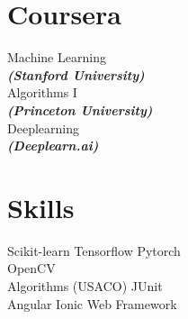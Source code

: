 \documentclass[]{deedy-resume-openfont}
\begin{document}
\begin{minipage}[t]{0.33\textwidth}
\section{Coursera}
Machine Learning \\
{\footnotesize \textit{\textbf{(Stanford University)}}} \\

\vspace{2mm}
Algorithms I \\
{\footnotesize \textit{\textbf{(Princeton University)}}} \\

\vspace{2mm}
Deeplearning \\
{\footnotesize \textit{\textbf{(Deeplearn.ai)}}} \\
\sectionsep


\section{Skills}

\textbullet{} Scikit-learn \textbullet{} Tensorflow \textbullet{} Pytorch \\
\textbullet{} OpenCV\\

\vspace{2mm}
\textbullet{} Algorithms (USACO) \textbullet{} JUnit \\

\vspace{2mm}
\textbullet{} Angular \textbullet{} Ionic Web Framework \\
\sectionsep

%
%

\end{minipage} 
\hfill
\end{document}

